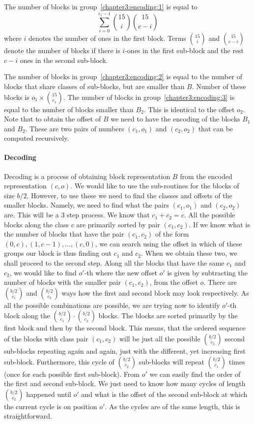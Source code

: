 The number of blocks in group~\ref{chapter3:encoding:1} is equal to
$$\sum_{i=0}^{c_1-1} {15\choose i} {15\choose c-i}$$ where $i$ denotes the number
of ones in the first block. Terms ${15\choose i}$ and ${15\choose c-i}$ denote the
number of blocks if there is $i$-ones in the first sub-block and the rest $c-i$ ones
in the second sub-block.

The number of blocks in group~\ref{chapter3:encoding:2} is equal to the number of blocks that
share classes of sub-blocks, but are smaller than $B$. Number of these blocks is $o_1\times {15\choose c_1}$.
The number of blocks in group~\ref{chapter3:encoding:3} is equal to the number of blocks smaller 
than $B_2$. This is identical to the offset $o_2$. Note that to obtain the offset of $B$
we need to have the encoding of the blocks $B_1$ and $B_2$. These are two pairs of numbers
$(c_1, o_1)$ and $(c_2, o_2)$ that can be computed recursively.

\paragraph{Decoding}

Decoding is a process of obtaining block representation $B$ from the encoded
representation $(c, o)$. We would like to use the sub-routines for the blocks
of size $b/2$. However, to use these we need to find the classes and offsets of
the smaller blocks. Namely, we need to find what the pairs $(c_1, o_1)$ and
$(c_2, o_2)$ are. This will be a 3 step process. We know that $c_1 + c_2 = c$.
All the possible blocks along the class $c$ are primarily sorted by pair $(c_1, c_2)$.
If we know what is the number of blocks that have the pair $(c_1, c_2)$ of the form
$(0, c), (1, c-1), \ldots , (c, 0)$, we can search using the offset in which of these
groups our block is thus finding out $c_1$ and $c_2$. When we obtain these two, we shall
proceed to the second step. Along all the blocks that have the same $c_1$ and $c_2$,
we would like to find $o'$-th where the new offset $o'$ is given by subtracting the number of
blocks with the smaller pair $(c_1, c_2)$, from the offset $o$. There are ${b/2 \choose c_1}$
and ${b/2 \choose c_2}$ ways how the first and second block may look respectively.
As all the possible combinations are possible, we are trying now to identify $o'$-th block
along the ${b/2 \choose c_1}\cdot {b/2 \choose c_2}$ blocks. The blocks are sorted primarily
by the first block and then by the second block. This means, that the ordered sequence of
the blocks with class pair $(c_1, c_2)$ will be just all the possible ${b/2 \choose c_2}$
second sub-blocks repeating again and again, just with the different, yet increasing
first sub-block. Furthermore, this cycle of ${b/2 \choose c_2}$ sub-blocks will repeat
${b/2 \choose c_1}$ times (once for each possible first sub-block). From $o'$ we can easily
find the order of the first and second sub-block. We just need to know how many cycles of length
${b/2 \choose c_2}$ happened until $o'$ and what is the offset of the second sub-block at which
the current cycle is on position $o'$. As the cycles are of the same length, this is straightforward.

